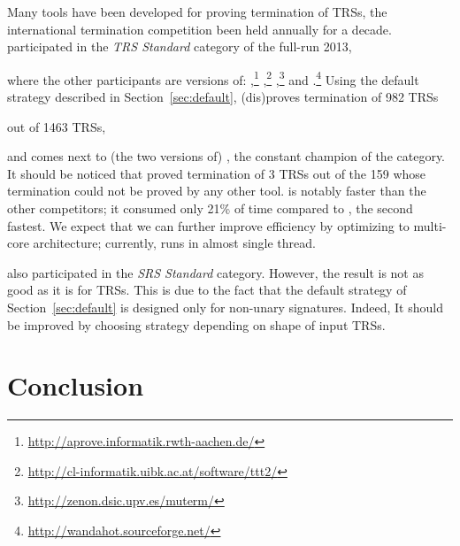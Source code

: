 \documentclass{llncs}
\newif\iffullversion
\begin{document}
Many tools have been developed for proving termination of TRSs,
 the international termination competition
 been held annually for a decade.
\NaTT participated 
in the \emph{TRS Standard} category of the full-run 2013,\iffullversion
	\footnote{\url{http://termcomp.uibk.ac.at/}}
\else
	{}
\fi
where the other participants are versions of:
\AProVE,\footnote{\url{http://aprove.informatik.rwth-aachen.de/}}
\TTTT,\footnote{\url{http://cl-informatik.uibk.ac.at/software/ttt2/}}
\muterm,\footnote{\url{http://zenon.dsic.upv.es/muterm/}}
and \Wanda.\footnote{\url{http://wandahot.sourceforge.net/}}
Using the default strategy described in Section~\ref{sec:default},
\NaTT (dis)proves termination of 982 TRSs
\iffullversion
	(unfortunately, the competition version of \NaTT failed to input 36 problems
	due to a bug in parser)
\else
	out of 1463 TRSs,
\fi
and comes next to (the two versions of) \AProVE,
the constant champion of the category.
It should be noticed that \NaTT proved termination of 3 TRSs
out of the 159 whose termination could not be proved by any other tool.
\NaTT is notably faster than the other competitors;
it consumed only 21\% of time compared to \AProVE, the second fastest.
We expect that we can further improve efficiency by optimizing 
to multi-core architecture; currently, \NaTT runs in almost single thread.

\NaTT also participated in the \emph{SRS Standard} category.
However, the result is not as good as it is for TRSs.
This is due to the fact that
the default strategy of Section~\ref{sec:default} is designed only for 
non-unary signatures.
Indeed,
It should be improved by choosing strategy depending on shape of input TRSs.

\section{Conclusion}
\label{sec:conclusion}
\end{document}
